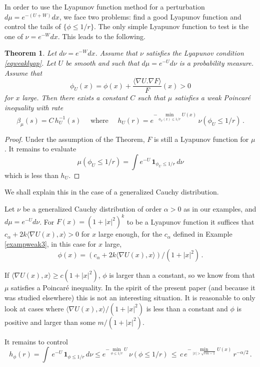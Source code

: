 \documentclass[11pt,reqno]{amsart}
\numberwithin{equation}{section}
\newtheorem{theorem}{Theorem}[section]
\theoremstyle{definition}
\theoremstyle{remark}
\begin{document}
In order to use the Lyapunov function method for a perturbation $d\mu=e^{-(U+W)}dx$, we face two problems: find a good Lyapunov function and control the tails of $\{\phi\leq 1/r\}$. The only simple Lyapunov function to test is the one of $\nu=e^{-W}dx$. This leads to the following.
\begin{theorem}\label{thmperturbWPlyap}
Let $d\nu=e^{-W} dx$. Assume that $\nu$ satisfies the Lyapunov condition \eqref{eqweaklyap}. Let $U$ be smooth and such that $d\mu=e^{-U} d\nu$ is a probability measure. Assume that $$\phi_U(x)= \phi(x) + \frac{\langle \nabla U.\nabla  F \rangle}{F}(x) >0 
$$ 
for $x$ large. Then there exists a constant $C$ such that $\mu$ satisfies a weak Poincar\'e inequality with rate $$\beta_\mu(s) = C \, h_U^{-1}(s) \quad \textrm{ where } \quad h_U(r)= e^{- \min_{\phi_U(x)\leq 1/r} U(x)} \, \nu(\phi_U\leq 1/r) \, .$$
\end{theorem}
\begin{proof}
Under the assumption of the Theorem, $F$ is still a Lyapunov function for $\mu$. It remains to evaluate $$\mu(\phi_U\leq 1/r)= \int e^{-U} \, \mathbf 1_{\phi_U\leq 1/r} \, d\nu$$ which is less than $h_U$.
\end{proof}

We shall explain this in the case of a generalized Cauchy distribution.

Let $\nu$ be a generalized Cauchy distribution of order $\alpha>0$ as in our examples, and $d\mu=e^{-U} d\nu$. For $F(x)=(1+|x|^2)^k$ to be a Lyapunov function it suffices that $c_\alpha + 2k \langle \nabla U(x), x\rangle >0$ for $x$ large enough, for the $c_\alpha$ defined in Example \ref{exampweak3}, in this case for $x$ large, $$\phi(x)=(c_\alpha + 2k \langle \nabla U(x), x\rangle)/(1+|x|^2) \, .$$ 

If $\langle\nabla U(x), x\rangle\geq c (1+|x|^2)$, $\phi$ is larger than a constant, so we know from \cite{BBCG} that $\mu$ satisfies a Poincar\'e inequality. In the spirit of the present paper (and because it was studied elsewhere) this is not an interesting situation. It is reasonable to only look at cases where $\langle\nabla U(x), x\rangle/(1+|x|^2)$ is less than a constant and $\phi$ is positive and larger than some $m/(1+|x|^2)$.


It remains to control $$h_\phi(r)=\int \, e^{-U} \, \mathbf 1_{\phi \leq 1/r} \, d\nu \leq e^{- \min_{\phi \leq 1/r} U} \, \nu(\phi \leq 1/r) \, \leq \, c \, {e^{- \min_{|x|>\sqrt{rm-1}} U(x)}} \, r^{-\alpha/2} \, .$$ 
\end{document}
